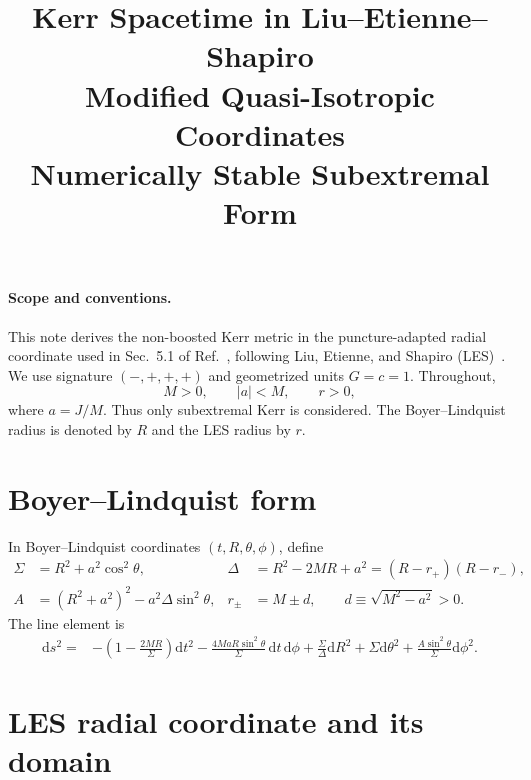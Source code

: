 \documentclass[11pt]{article}
\title{Kerr Spacetime in Liu--Etienne--Shapiro\\Modified Quasi-Isotropic Coordinates\\[0.35em]\large Numerically Stable Subextremal Form}
\author{}
\date{}
\newcommand{\dd}{\mathrm{d}}
\newcommand{\RBL}{R}
\begin{document}
\maketitle
\vspace{-2.2em}

\paragraph{Scope and conventions.}
This note derives the non-boosted Kerr metric in the puncture-adapted radial coordinate used in Sec.~5.1 of Ref.~\cite{Assumpcao2024}, following Liu, Etienne, and Shapiro (LES)~\cite{Liu2009}. We use signature $(-,+,+,+)$ and geometrized units $G=c=1$. Throughout,
\begin{equation}
 M>0,\qquad |a|<M,\qquad r>0, \label{eq:domain}
\end{equation}
where $a=J/M$. Thus only subextremal Kerr is considered. The Boyer--Lindquist radius is denoted by $\RBL$ and the LES radius by $r$.

\section{Boyer--Lindquist form}

In Boyer--Lindquist coordinates $(t,\RBL,\theta,\phi)$, define
\begin{align}
 \Sigma &= \RBL^2+a^2\cos^2\theta, &
 \Delta &= \RBL^2-2M\RBL+a^2=(\RBL-r_+)(\RBL-r_-), \label{eq:BLdefs1}\\
 A&=(\RBL^2+a^2)^2-a^2\Delta\sin^2\theta, &
 r_\pm&=M\pm d,\qquad d\equiv\sqrt{M^2-a^2}>0. \label{eq:BLdefs2}
\end{align}
The line element is
\begin{align}
 \dd s^2={}&-\left(1-\frac{2M\RBL}{\Sigma}\right)\dd t^2
 -\frac{4Ma\RBL\sin^2\theta}{\Sigma}\,\dd t\,\dd\phi
 +\frac{\Sigma}{\Delta}\dd\RBL^2+\Sigma\dd\theta^2
 +\frac{A\sin^2\theta}{\Sigma}\dd\phi^2 . \label{eq:BLmetric}
\end{align}

\section{LES radial coordinate and its domain}
\end{document}
